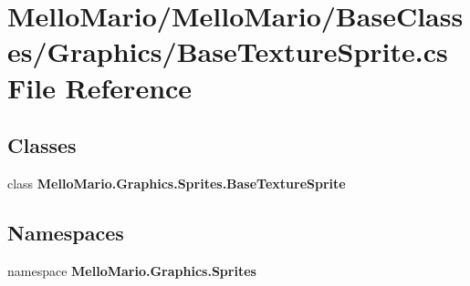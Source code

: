 \section{Mello\+Mario/\+Mello\+Mario/\+Base\+Classes/\+Graphics/\+Base\+Texture\+Sprite.cs File Reference}
\label{BaseTextureSprite_8cs}
\subsection*{Classes}
\begin{DoxyCompactItemize}
\item 
class \textbf{ Mello\+Mario.\+Graphics.\+Sprites.\+Base\+Texture\+Sprite}
\end{DoxyCompactItemize}
\subsection*{Namespaces}
\begin{DoxyCompactItemize}
\item 
namespace \textbf{ Mello\+Mario.\+Graphics.\+Sprites}
\end{DoxyCompactItemize}
